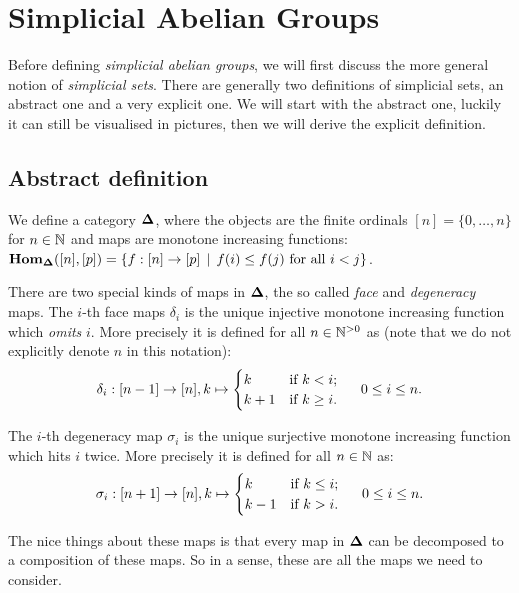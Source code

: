 \section{Simplicial Abelian Groups}
\label{sec:Simplicial Abelian Groups}

Before defining \emph{simplicial abelian groups}, we will first discuss the more general notion of \emph{simplicial sets}. There are generally two definitions of simplicial sets, an abstract one and a very explicit one. We will start with the abstract one, luckily it can still be visualised in pictures, then we will derive the explicit definition.

\subsection{Abstract definition}
\begin{definition}
	We define a category $\mathbf{\Delta}$, where the objects are the finite ordinals $[n] = \{0, \dots, n\}$ for $n \in \mathbb{N}$ and maps are monotone increasing functions: $\mathbf{Hom}_{\mathbf{\Delta}}([n], [p]) = \{ f : [n] \to [p] \,\mid\, f(i) \leq f(j) \text{ for all } i < j \}$.
\end{definition}

There are two special kinds of maps in $\mathbf{\Delta}$, the so called \emph{face} and \emph{degeneracy} maps. The $i$-th face maps $\delta_i$ is the unique injective monotone increasing function which \emph{omits} $i$. More precisely it is defined for all $n \in {\mathbb{N}^{>0}}$ as (note that we do not explicitly denote $n$ in this notation):
$$ \delta_i: [n-1] \to [n], k \mapsto \begin{cases} k & \text{if } k < i;\\ k+1 & \text{if } k \geq i. \end{cases} \hspace{0.5cm} 0 \leq i \leq n. $$

The $i$-th degeneracy map $\sigma_i$ is the unique surjective monotone increasing function which hits $i$ twice. More precisely it is defined for all $n \in \mathbb{N}$ as:
$$ \sigma_i: [n+1] \to [n], k \mapsto \begin{cases} k & \text{if } k \leq i;\\ k-1 & \text{if } k > i. \end{cases} \hspace{0.5cm} 0 \leq i \leq n. $$

The nice things about these maps is that every map in $\mathbf{\Delta}$ can be decomposed to a composition of these maps. So in a sense, these are all the maps we need to consider.


